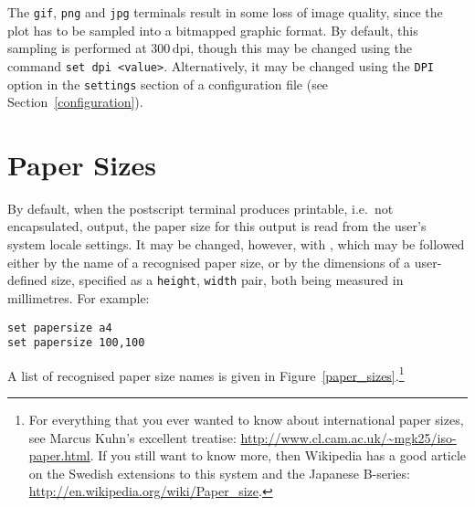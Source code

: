 The {\tt gif}, {\tt png} and {\tt jpg} terminals result in some loss of image
quality, since the plot has to be sampled into a bitmapped graphic format.  By
default, this sampling is performed at $300\,\mathrm{dpi}$, though this may be
changed using the command {\tt set dpi <value>}. Alternatively, it may be
changed using the {\tt DPI} option in the {\tt settings} section of a
configuration file (see Section~\ref{configuration}).

\section{Paper Sizes}

By default, when the postscript terminal produces printable, i.e.\ not
encapsulated, output, the paper size for this output is read from the user's
system locale settings. It may be changed, however, with , which may be followed either by the name of a recognised paper
size, or by the dimensions of a user-defined size, specified as a {\tt height},
{\tt width} pair, both being measured in millimetres. For example:

\begin{verbatim}
set papersize a4
set papersize 100,100
\end{verbatim}

\noindent A list of recognised paper size names is given in
Figure~\ref{paper_sizes}.\footnote{For everything that you ever wanted to know
about international paper sizes, see Marcus Kuhn's excellent treatise:
\url{http://www.cl.cam.ac.uk/~mgk25/iso-paper.html}. If you still want to know
more, then Wikipedia has a good article on the Swedish extensions to this
system and the Japanese B-series:
\url{http://en.wikipedia.org/wiki/Paper_size}.}

